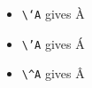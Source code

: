 \documentclass{article}
\begin{document}
\begin{itemize}




  \item \texttt{\textbackslash `A} gives \`A
  \item \texttt{\textbackslash 'A} gives \'A
  \item \texttt{\textbackslash \^{}A} gives \^A


\end{itemize}
\end{document}
